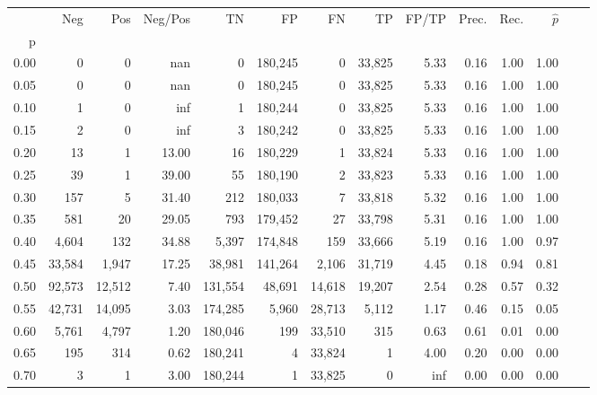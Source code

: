 \begin{tabular}{rrrrrrrrrrrrrr}
\toprule
{} &     Neg &     Pos & Neg/Pos &       TN &       FP &      FN &      TP & FP/TP & Prec. &  Rec. & $\hat{p}$ \\
p    &         &         &         &          &          &         &         &       &       &       &           \\
\midrule
0.00 &       0 &       0 &     nan &        0 &  180,245 &       0 &  33,825 &  5.33 &  0.16 &  1.00 &      1.00 \\
0.05 &       0 &       0 &     nan &        0 &  180,245 &       0 &  33,825 &  5.33 &  0.16 &  1.00 &      1.00 \\
0.10 &       1 &       0 &     inf &        1 &  180,244 &       0 &  33,825 &  5.33 &  0.16 &  1.00 &      1.00 \\
0.15 &       2 &       0 &     inf &        3 &  180,242 &       0 &  33,825 &  5.33 &  0.16 &  1.00 &      1.00 \\
0.20 &      13 &       1 &   13.00 &       16 &  180,229 &       1 &  33,824 &  5.33 &  0.16 &  1.00 &      1.00 \\
0.25 &      39 &       1 &   39.00 &       55 &  180,190 &       2 &  33,823 &  5.33 &  0.16 &  1.00 &      1.00 \\
0.30 &     157 &       5 &   31.40 &      212 &  180,033 &       7 &  33,818 &  5.32 &  0.16 &  1.00 &      1.00 \\
0.35 &     581 &      20 &   29.05 &      793 &  179,452 &      27 &  33,798 &  5.31 &  0.16 &  1.00 &      1.00 \\
0.40 &   4,604 &     132 &   34.88 &    5,397 &  174,848 &     159 &  33,666 &  5.19 &  0.16 &  1.00 &      0.97 \\
0.45 &  33,584 &   1,947 &   17.25 &   38,981 &  141,264 &   2,106 &  31,719 &  4.45 &  0.18 &  0.94 &      0.81 \\
0.50 &  92,573 &  12,512 &    7.40 &  131,554 &   48,691 &  14,618 &  19,207 &  2.54 &  0.28 &  0.57 &      0.32 \\
0.55 &  42,731 &  14,095 &    3.03 &  174,285 &    5,960 &  28,713 &   5,112 &  1.17 &  0.46 &  0.15 &      0.05 \\
0.60 &   5,761 &   4,797 &    1.20 &  180,046 &      199 &  33,510 &     315 &  0.63 &  0.61 &  0.01 &      0.00 \\
0.65 &     195 &     314 &    0.62 &  180,241 &        4 &  33,824 &       1 &  4.00 &  0.20 &  0.00 &      0.00 \\
0.70 &       3 &       1 &    3.00 &  180,244 &        1 &  33,825 &       0 &   inf &  0.00 &  0.00 &      0.00 \\

\end{tabular}
